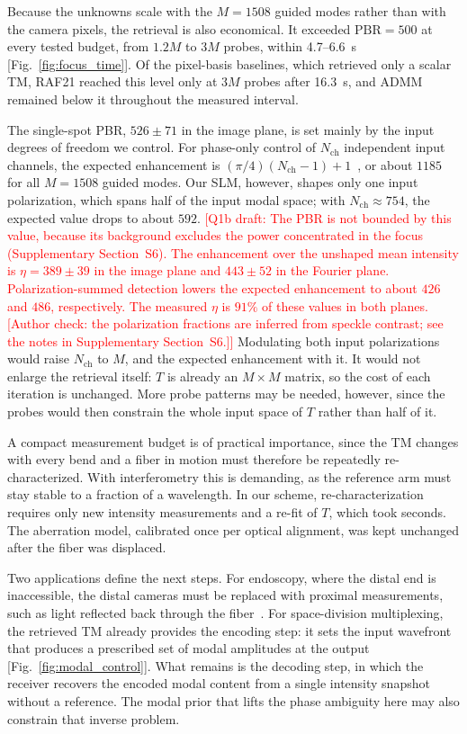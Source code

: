 \documentclass{article}
\begin{document}
Because the unknowns scale with the $M=1508$ guided modes rather than with the camera pixels, the retrieval is also economical. It exceeded $\mathrm{PBR}=500$ at every tested budget, from $1.2M$ to $3M$ probes, within 4.7--6.6~s [Fig.~\ref{fig:focus_time}]. Of the pixel-basis baselines, which retrieved only a scalar TM, RAF21 reached this level only at $3M$ probes after 16.3~s, and ADMM remained below it throughout the measured interval.

The single-spot PBR, $526\pm71$ in the image plane, is set mainly by the input degrees of freedom we control. For phase-only control of $N_{\mathrm{ch}}$ independent input channels, the expected enhancement is $(\pi/4)(N_{\mathrm{ch}}-1)+1$~\cite{focusing_coherent}, or about $1185$ for all $M=1508$ guided modes. Our SLM, however, shapes only one input polarization, which spans half of the input modal space; with $N_{\mathrm{ch}}\approx754$, the expected value drops to about $592$. \textcolor{red}{[Q1b draft: The PBR is not bounded by this value, because its background excludes the power concentrated in the focus (Supplementary Section~S6). The enhancement over the unshaped mean intensity is $\eta=389\pm39$ in the image plane and $443\pm52$ in the Fourier plane. Polarization-summed detection lowers the expected enhancement to about $426$ and $486$, respectively. The measured $\eta$ is $91\%$ of these values in both planes. [Author check: the polarization fractions are inferred from speckle contrast; see the notes in Supplementary Section~S6.]]} Modulating both input polarizations would raise $N_{\mathrm{ch}}$ to $M$, and the expected enhancement with it. It would not enlarge the retrieval itself: $T$ is already an $M\times M$ matrix, so the cost of each iteration is unchanged. More probe patterns may be needed, however, since the probes would then constrain the whole input space of $T$ rather than half of it.

A compact measurement budget is of practical importance, since the TM changes with every bend and a fiber in motion must therefore be repeatedly re-characterized. With interferometry this is demanding, as the reference arm must stay stable to a fraction of a wavelength. In our scheme, re-characterization requires only new intensity measurements and a re-fit of $T$, which took seconds. The aberration model, calibrated once per optical alignment, was kept unchanged after the fiber was displaced.

Two applications define the next steps. For endoscopy, where the distal end is inaccessible, the distal cameras must be replaced with proximal measurements, such as light reflected back through the fiber~\cite{Characterizing_Optical_Fiber_Transmission}. For space-division multiplexing, the retrieved TM already provides the encoding step: it sets the input wavefront that produces a prescribed set of modal amplitudes at the output [Fig.~\ref{fig:modal_control}]. What remains is the decoding step, in which the receiver recovers the encoded modal content from a single intensity snapshot without a reference. The modal prior that lifts the phase ambiguity here may also constrain that inverse problem.
\end{document}
